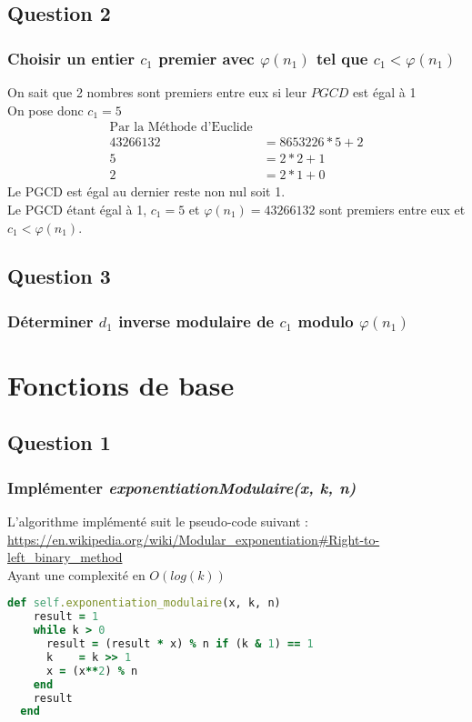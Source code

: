 \documentclass[a4paper,10pt]{article}
\begin{document}
\subsection{Question 2}
\subsubsection{Choisir un entier $c_1$ premier avec $\varphi(n_1)$ tel que $c_1 < \varphi(n_1)$}
On sait que 2 nombres sont premiers entre eux si leur $PGCD$ est égal à 1\\
On pose donc $c_1 = 5$
\begin{align*}
\text{Par la Méthode d'Euclide}&\\
43266132 &= 8653226*5 + 2\\
5 &= 2*2 + 1\\
2 &= 2*1 + 0
\end{align*}
Le PGCD est égal au dernier reste non nul soit 1.\\ 
Le PGCD étant égal à 1, $c_1 = 5$ et $\varphi(n_1) = 43266132$ sont premiers entre eux et $c_1 < \varphi(n_1)$.

\subsection{Question 3}
\subsubsection{Déterminer $d_1$ inverse modulaire de $c_1$ modulo $\varphi(n_1)$}

\clearpage
\section{Fonctions de base}
\subsection{Question 1}
\subsubsection{Implémenter \textit{exponentiationModulaire(x, k, n)}}
L'algorithme implémenté suit le pseudo-code suivant :\\
 \url{https://en.wikipedia.org/wiki/Modular_exponentiation#Right-to-left_binary_method}\\
 Ayant une complexité en $O(log(k))$
\begin{lstlisting}[language=Ruby]
  def self.exponentiation_modulaire(x, k, n)
    result = 1
    while k > 0
      result = (result * x) % n if (k & 1) == 1
      k    = k >> 1
      x = (x**2) % n
    end
    result
  end
\end{lstlisting}
\end{document}

